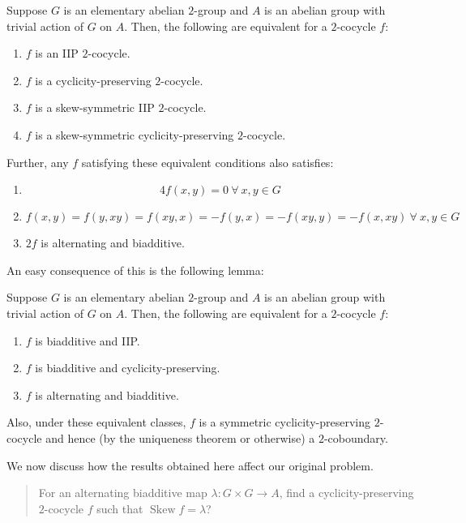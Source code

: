 \documentclass[10pt]{amsart}
\newcommand{\Skew}{\operatorname{Skew}}
\begin{document}
\begin{lemma}\label{CP2cocycleonelab}
  Suppose $G$ is an elementary abelian $2$-group and $A$ is an abelian
  group with trivial action of $G$ on $A$. Then, the following are
  equivalent for a $2$-cocycle $f$:

  \begin{enumerate}
  \item $f$ is an IIP $2$-cocycle.
  \item $f$ is a cyclicity-preserving $2$-cocycle.
  \item $f$ is a skew-symmetric IIP $2$-cocycle.
  \item $f$ is a skew-symmetric cyclicity-preserving $2$-cocycle.
  \end{enumerate}

  Further, any $f$ satisfying these equivalent conditions also satisfies:

  \begin{enumerate}
  \item $$4f(x,y) = 0 \ \forall \ x,y \in G$$
  \item $$f(x,y) = f(y,xy) = f(xy,x) = -f(y,x) = -f(xy,y) = -f(x,xy) \ \forall \ x,y \in G$$
  \item $2f$ is alternating and biadditive.
  \end{enumerate}
\end{lemma}

An easy consequence of this is the following lemma:

\begin{lemma}
  Suppose $G$ is an elementary abelian $2$-group and $A$ is an abelian
  group with trivial action of $G$ on $A$. Then, the following are
  equivalent for a $2$-cocycle $f$:

  \begin{enumerate}
  \item $f$ is biadditive and IIP.
  \item $f$ is biadditive and cyclicity-preserving.
  \item $f$ is alternating and biadditive.
  \end{enumerate}

  Also, under these equivalent classes, $f$ is a symmetric
  cyclicity-preserving $2$-cocycle and hence (by the uniqueness theorem
  or otherwise) a $2$-coboundary.
\end{lemma}

We now discuss how the results obtained here affect our original problem. 

\begin{quote}
  For an alternating biadditive map $\lambda: G \times G \to A$, find
  a cyclicity-preserving $2$-cocycle $f$ such that $\Skew f =
  \lambda$?
\end{quote}
\end{document}
